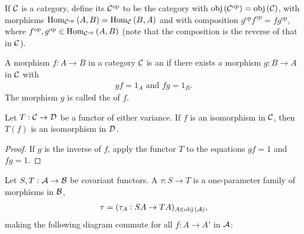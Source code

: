     \begin{definition}\label{def:opposite-categories}
        If $\mathcal{C}$ is a category, define its  $\mathcal{C}^\text{op}$ to be the category with $\operatorname{obj}{(\mathcal{C}^\text{op})} = \operatorname{obj}{(\mathcal{C})}$, with morphisms $\operatorname{Hom}_{\mathcal{C}^\text{op}}{(A,B)} = \operatorname{Hom}_{\mathcal{C}}{(B,A)}$ and with composition $g^\text{op}f^\text{op} = fg^\text{op}$, where $f^\text{op} , g^\text{op} \in \operatorname{Hom}_{\mathcal{C}^\text{op}}{(A,B)}$ (note that the composition is the reverse of that in $\mathcal{C}$).
    \end{definition}

    \begin{definition}\label{def:isomorphsism}
        A morphism $f:A \rightarrow B$ in a category $\mathcal{C}$ is an  if there exists a morphism $g: B \rightarrow A$ in $\mathcal{C}$ with
            \begin{equation*}
            \begin{split}
                gf = 1_A \hspace{4pt} \text{and} \hspace{4pt} fg = 1_B.
            \end{split}
            \end{equation*}
        The morphism $g$ is called the  of $f$.
    \end{definition}

    \begin{proposition}
        Let $T:\mathcal{C} \rightarrow \mathcal{D}$ be a functor of either variance. If $f$ is an isomorphism in $\mathcal{C}$, then $T(f)$ is an isomorphism in $\mathcal{D}$.
    \end{proposition}
        \begin{proof}
            If $g$ is the inverse of $f$, apply the functor $T$ to the equations $gf = 1$ and $fg = 1$.
        \end{proof}
    
    \begin{definition}\label{def:natural-transformation}
        Let $S,T: \mathcal{A} \rightarrow \mathcal{B}$ be covariant functors. A  $\tau: S \rightarrow T$ is a one-parameter family of morphisms in $\mathcal{B}$,
            \begin{equation*}
            \begin{split}
                \tau = (\tau_A : SA \rightarrow TA)_{A \in \operatorname{obj}{(\mathcal{A})}},
            \end{split}
            \end{equation*}
        making the following diagram commute for all $f: A \rightarrow A'$ in $\mathcal{A}$:
            \begin{center}
            \end{center}
    \end{definition}


